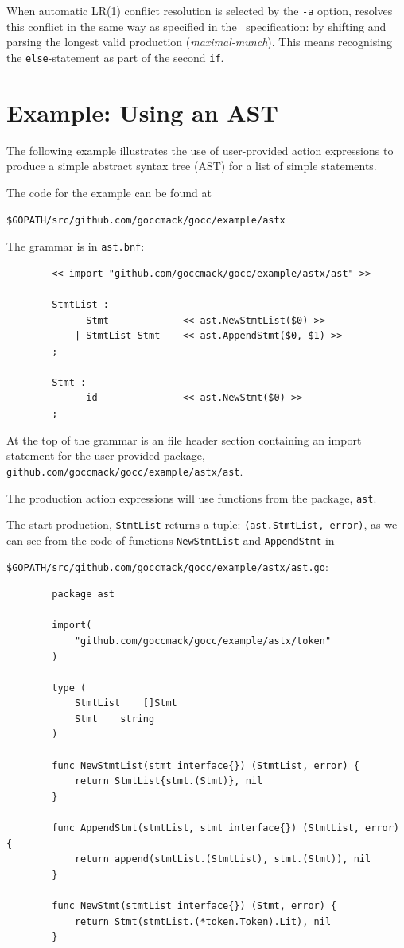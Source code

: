 \documentclass[12pt]{article}
\begin{document}
	When automatic LR(1) conflict resolution is selected by the \verb|-a| option, \gocc resolves this conflict in the same way as specified in the \Clang\ specification: by shifting and parsing the longest valid production ({\em maximal-munch}). This means recognising the \verb|else|-statement as part of the second \verb|if|.

\section{Example: Using an AST} \label{sec:example ast}
	The following example illustrates the use of user-provided action expressions to produce a simple abstract syntax tree (AST) for a list of simple statements.

	The code for the example can be found at

	\verb|$GOPATH/src/github.com/goccmack/gocc/example/astx|

	The grammar is in \verb|ast.bnf|:

	\begin{verbatim}
		<< import "github.com/goccmack/gocc/example/astx/ast" >>

		StmtList :
		      Stmt             << ast.NewStmtList($0) >>
		    | StmtList Stmt    << ast.AppendStmt($0, $1) >>
		;

		Stmt :
		      id               << ast.NewStmt($0) >>
		;
	\end{verbatim}

	At the top of the grammar is an file header section containing an import statement for the user-provided package,
	\verb|github.com/goccmack/gocc/example/astx/ast|.

	The production action expressions will use functions from the package, \verb|ast|.

	The start production, \verb"StmtList" returns a tuple: \verb|(ast.StmtList, error)|, as we can see from the code of functions
	\verb|NewStmtList| and \verb|AppendStmt| in

	\verb|$GOPATH/src/github.com/goccmack/gocc/example/astx/ast.go|:

	\begin{verbatim}
		package ast

		import(
		    "github.com/goccmack/gocc/example/astx/token"
		)

		type (
		    StmtList	[]Stmt
		    Stmt 	string
		)

		func NewStmtList(stmt interface{}) (StmtList, error) {
		    return StmtList{stmt.(Stmt)}, nil
		}

		func AppendStmt(stmtList, stmt interface{}) (StmtList, error) {
		    return append(stmtList.(StmtList), stmt.(Stmt)), nil
		}

		func NewStmt(stmtList interface{}) (Stmt, error) {
		    return Stmt(stmtList.(*token.Token).Lit), nil
		}
	\end{verbatim}
\end{document}
